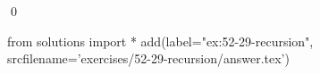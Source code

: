 
\begin{ex}
  \label{ex:52-29-recursion}
  
  \qed
\end{ex}
\begin{python0}
from solutions import *
add(label="ex:52-29-recursion",
    srcfilename='exercises/52-29-recursion/answer.tex')
\end{python0}
